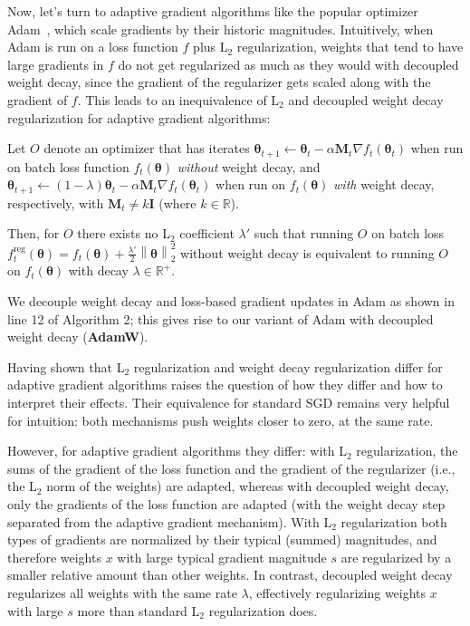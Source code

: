Now, let's turn to adaptive gradient algorithms like the popular optimizer Adam~\cite{kingma2014adam}, which scale gradients by their historic magnitudes. Intuitively, when Adam is run on a loss function $f$ plus L$_2$ regularization, weights that tend to have large gradients in $f$ do not get regularized as much as they would with decoupled weight decay, since the gradient of the regularizer gets scaled along with the gradient of $f$. This leads to an inequivalence of L$_2$ and decoupled weight decay regularization for adaptive gradient algorithms:

\begin{prop} Let $O$ denote an optimizer that has iterates $\bm{\theta}_{t+1} \leftarrow \bm{\theta}_t - \alpha \mathbf{M}_t \nabla f_t(\bm{\theta}_t)$ when run on batch loss function $f_t(\bm{\theta})$ \emph{without} weight decay, and 
$\bm{\theta}_{t+1} \leftarrow (1 - \lambda) \bm{\theta}_t - \alpha \mathbf{M}_t \nabla f_t(\bm{\theta}_t)$ when run on $f_t(\bm{\theta})$ \emph{with} weight decay, respectively, with $\mathbf{M}_t \neq k \mathbf{I}$ (where $k\in\mathbb{R}$). 

Then, for $O$ there exists no L$_2$ coefficient $\lambda'$ such that running $O$ on batch loss $f^{\text{reg}}_t(\bm{\theta}) = f_t(\bm{\theta}) + \frac{\lambda'}{2} \left\lVert\bm{\theta}\right\rVert_2^2$ without weight decay is equivalent to running $O$ on $f_t(\bm{\theta})$ with decay $\lambda\in\mathbb{R}^+$. 

\end{prop}

We decouple weight decay and loss-based gradient updates in Adam as shown in line 12 of Algorithm 2; this gives rise to our variant of Adam with decoupled weight decay (\textbf{AdamW}). 

Having shown that L$_2$ regularization and weight decay regularization differ for adaptive gradient algorithms raises the question of how they differ and how to interpret their effects. Their equivalence for standard SGD remains very helpful for intuition: both mechanisms push weights closer to zero, at the same rate.

However, for adaptive gradient algorithms they differ: with L$_2$  regularization, the sums of the gradient of the loss function and the gradient of the regularizer (i.e., the L$_2$  norm of the weights) are adapted, whereas with decoupled weight decay, only the gradients of the loss function are adapted (with the weight decay step separated from the adaptive gradient mechanism). With L$_2$ regularization both types of gradients are normalized by their typical (summed) magnitudes, and therefore weights $x$ with large typical gradient magnitude $s$ are regularized by a smaller relative amount than other weights. In contrast, decoupled weight decay regularizes all weights with the same rate $\lambda$, effectively regularizing weights $x$ with large $s$ more than standard L$_2$ regularization does.

